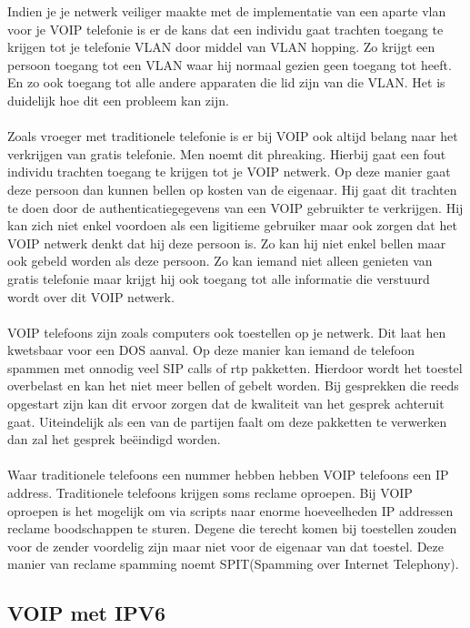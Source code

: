 \documentclass[pdftex,a4paper,12pt,twoside]{report}
\begin{document}
\newpage
Indien je je netwerk veiliger maakte met de implementatie van een aparte vlan voor je VOIP telefonie is er de kans dat een individu gaat trachten toegang te krijgen tot je telefonie VLAN door middel van VLAN hopping. Zo krijgt een persoon toegang tot een VLAN waar hij normaal gezien geen toegang tot heeft. En zo ook toegang tot alle andere apparaten die lid zijn van die VLAN.
Het is duidelijk hoe dit een probleem kan zijn.
\\ \\
Zoals vroeger met traditionele telefonie is er bij VOIP ook altijd belang naar het verkrijgen van gratis telefonie. Men noemt dit phreaking. Hierbij gaat een fout individu trachten toegang te krijgen tot je VOIP netwerk. Op deze manier gaat deze persoon dan kunnen bellen op kosten van de eigenaar. Hij gaat dit trachten te doen door de authenticatiegegevens van een VOIP 		gebruikter te verkrijgen. Hij kan zich niet enkel voordoen als een ligitieme gebruiker maar ook zorgen dat het VOIP netwerk denkt dat hij deze persoon is. Zo kan hij niet enkel bellen maar ook gebeld worden als deze persoon. Zo kan iemand niet alleen genieten van gratis telefonie maar krijgt hij ook toegang tot alle informatie die verstuurd wordt over dit VOIP netwerk.
\\ \\
VOIP telefoons zijn zoals computers ook toestellen op je netwerk. Dit laat hen kwetsbaar voor een DOS aanval. Op deze manier kan iemand de telefoon spammen met onnodig veel SIP calls of rtp pakketten. Hierdoor wordt het toestel overbelast en kan het niet meer bellen of gebelt worden. Bij gesprekken die reeds opgestart zijn kan dit ervoor zorgen dat de kwaliteit van het gesprek achteruit gaat. Uiteindelijk als een van de partijen faalt om deze pakketten te verwerken dan zal het gesprek beëindigd worden.
\\ \\
Waar traditionele telefoons een nummer hebben hebben VOIP telefoons een IP address. Traditionele telefoons krijgen soms reclame oproepen. Bij VOIP oproepen is het mogelijk om via scripts naar enorme hoeveelheden IP addressen reclame boodschappen te sturen. Degene die terecht  komen bij toestellen zouden voor de zender voordelig zijn maar niet voor de eigenaar van dat toestel. Deze manier van reclame spamming noemt SPIT(Spamming over Internet Telephony).

 \newpage
\subsection{VOIP met IPV6}
	
\end{document}
